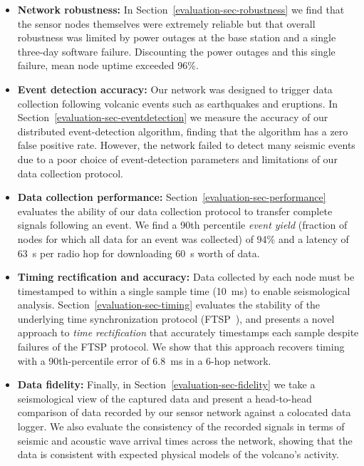 \begin{itemize}

\item \textbf{Network robustness:} In Section~\ref{evaluation-sec-robustness}
we find that the sensor nodes themselves were extremely reliable but that
overall robustness was limited by power outages at the base station and a
single three-day software failure. Discounting the power outages and this
single failure, mean node uptime exceeded 96\%.

\item \textbf{Event detection accuracy:} Our network was designed to trigger
data collection following volcanic events such as earthquakes and eruptions.
In Section~\ref{evaluation-sec-eventdetection} we measure the accuracy of our
distributed event-detection algorithm, finding that the algorithm has a zero
false positive rate. However, the network failed to detect many seismic
events due to a poor choice of event-detection parameters and limitations of
our data collection protocol.

\item \textbf{Data collection performance:}
Section~\ref{evaluation-sec-performance} evaluates the ability of our data
collection protocol to transfer complete signals following an event. We find
a 90th percentile \textit{event yield} (fraction of nodes for which all data
for an event was collected) of 94\% and a latency of 63~s per radio hop for
downloading 60~s worth of data.

\item \textbf{Timing rectification and accuracy:} Data collected by each node
must be timestamped to within a single sample time (10~ms) to enable
seismological analysis. Section~\ref{evaluation-sec-timing} evaluates the
stability of the underlying time synchronization protocol (FTSP~\cite{ftsp}),
and presents a novel approach to \textit{time rectification} that accurately
timestamps each sample despite failures of the FTSP protocol. We show that
this approach recovers timing with a 90th-percentile error of 6.8~ms in a
6-hop network.

\item \textbf{Data fidelity:} Finally, in
Section~\ref{evaluation-sec-fidelity} we take a seismological view of the
captured data and present a head-to-head comparison of data recorded by our
sensor network against a colocated data logger. We also evaluate the
consistency of the recorded signals in terms of seismic and acoustic wave
arrival times across the network, showing that the data is consistent with
expected physical models of the volcano's activity.

\end{itemize}
